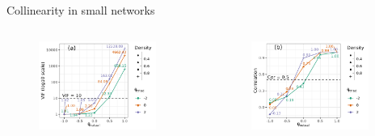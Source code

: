 \documentclass[
  ignorenonframetext,
  aspectratio=169,
]{beamer}
\begin{document}
\begin{frame}{Collinearity in small networks}
\protect\hypertarget{collinearity-in-small-networks}{}
\begin{columns}[T]
\begin{column}{0.5\textwidth}
\begin{figure}

{\centering \includegraphics[width=0.9\textwidth,height=\textheight]{figures/vif-n=5.png}

}

\end{figure}
\end{column}

\begin{column}{0.5\textwidth}
\begin{figure}

{\centering \includegraphics[width=0.9\textwidth,height=\textheight]{figures/cor-n=5.png}

}

\end{figure}
\end{column}
\end{columns}
\end{frame}
\end{document}
